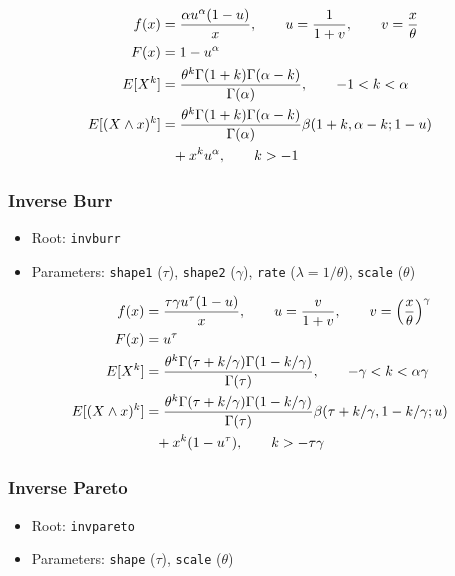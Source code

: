 \documentclass[x11names]{article}
\newcommand{\E}[1]{E[ #1 ]}
\newcommand{\code}[1]{\texttt{#1}}
\begin{document}
\begin{align*}
  f(x)
  &= \frac{\alpha u^\alpha (1 - u)}{x},
    \qquad u = \frac{1}{1 + v},
    \qquad v = \frac{x}{\theta} \\
  F(x)
  &= 1 - u^\alpha \\
  \E{X^k}
  &= \frac{%
    \theta^k \Gamma(1+k) \Gamma(\alpha-k)}{%
    \Gamma(\alpha)},
    \qquad -1 < k < \alpha \\
  \E{(X \wedge x)^k}
  &= \frac{%
    \theta^k \Gamma(1+k) \Gamma(\alpha-k)}{%
    \Gamma(\alpha)}
    \beta(1+k, \alpha-k; 1-u) \\
  &\phantom{=} + x^k u^\alpha,
    \qquad k > -1
\end{align*}

\subsubsection*{Inverse Burr}

\begin{itemize}
\item Root: \code{invburr}
\item Parameters: \code{shape1} ($\tau$),
      \code{shape2} ($\gamma$),
      \code{rate}   ($\lambda = 1/\theta$),
      \code{scale}  ($\theta$)
\end{itemize}

\begin{align*}
  f(x)
  &= \frac{\tau \gamma u^\tau (1 - u)}{x},
    \qquad u = \frac{v}{1 + v},
    \qquad v = \left( \frac{x}{\theta} \right)^\gamma \\
  F(x)
  &= u^\tau \\
  \E{X^k}
  &= \frac{%
    \theta^k \Gamma(\tau+k/\gamma) \Gamma(1-k/\gamma)}{%
    \Gamma(\tau)},
    \qquad -\gamma < k < \alpha\gamma \\
  \E{(X \wedge x)^k}
  &= \frac{%
    \theta^k \Gamma(\tau+k/\gamma) \Gamma(1-k/\gamma)}{%
    \Gamma(\tau)}
    \beta(\tau+k/\gamma, 1-k/\gamma; u) \\
  &\phantom{=} + x^k (1-u^\tau),
    \qquad k > -\tau\gamma
\end{align*}

\subsubsection*{Inverse Pareto}

\begin{itemize}
\item Root: \code{invpareto}
\item Parameters: \code{shape} ($\tau$),
      \code{scale}  ($\theta$)
\end{itemize}
\end{document}
